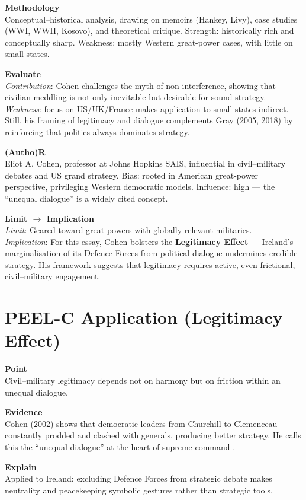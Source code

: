 \textbf{Methodology} \\
Conceptual--historical analysis, drawing on memoirs (Hankey, Livy), case studies (WWI, WWII, Kosovo), and theoretical critique. Strength: historically rich and conceptually sharp. Weakness: mostly Western great-power cases, with little on small states.

\textbf{Evaluate} \\
\textit{Contribution}: Cohen challenges the myth of non-interference, showing that civilian meddling is not only inevitable but desirable for sound strategy. \\
\textit{Weakness}: focus on US/UK/France makes application to small states indirect. Still, his framing of legitimacy and dialogue complements Gray (2005, 2018) by reinforcing that politics always dominates strategy.

\textbf{(Autho)R} \\
Eliot A. Cohen, professor at Johns Hopkins SAIS, influential in civil--military debates and US grand strategy. Bias: rooted in American great-power perspective, privileging Western democratic models. Influence: high --- the ``unequal dialogue'' is a widely cited concept.

\textbf{Limit $\rightarrow$ Implication} \\
\textit{Limit}: Geared toward great powers with globally relevant militaries. \\
\textit{Implication}: For this essay, Cohen bolsters the \textbf{Legitimacy Effect} --- Ireland’s marginalisation of its Defence Forces from political dialogue undermines credible strategy. His framework suggests that legitimacy requires active, even frictional, civil--military engagement.

\section*{PEEL-C Application (Legitimacy Effect)}

\textbf{Point} \\
Civil--military legitimacy depends not on harmony but on friction within an unequal dialogue.  

\textbf{Evidence} \\
Cohen (2002) shows that democratic leaders from Churchill to Clemenceau constantly prodded and clashed with generals, producing better strategy. He calls this the ``unequal dialogue'' at the heart of supreme command \parencite{COHEN_2002}.  

\textbf{Explain} \\
Applied to Ireland: excluding Defence Forces from strategic debate makes neutrality and peacekeeping symbolic gestures rather than strategic tools.  

